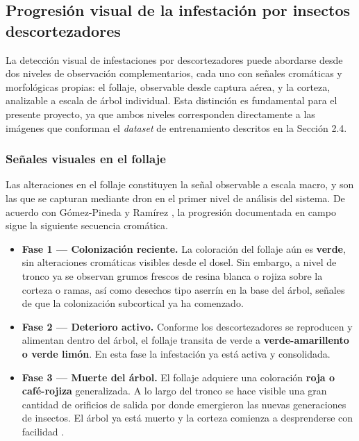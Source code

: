 \subsection{Progresión visual de la infestación por insectos descortezadores}

La detección visual de infestaciones por descortezadores puede abordarse desde dos niveles de observación complementarios, cada uno con señales cromáticas y morfológicas propias: el follaje, observable desde captura aérea, y la corteza, analizable a escala de árbol individual. Esta distinción es fundamental para el presente proyecto, ya que ambos niveles corresponden directamente a las imágenes que conforman el \textit{dataset} de entrenamiento descritos en la Sección 2.4.

\subsubsection{Señales visuales en el follaje}

Las alteraciones en el follaje constituyen la señal observable a escala macro, y son las que se capturan mediante dron en el primer nivel de análisis del sistema. De acuerdo con Gómez-Pineda y Ramírez \cite{gomez_pineda_ramirez2023descortezadores}, la progresión documentada en campo sigue la siguiente secuencia cromática. 

\begin{itemize}
    \item \textbf{Fase 1 --- Colonización reciente.} La coloración del follaje aún es \textbf{verde}, sin alteraciones cromáticas visibles desde el dosel. Sin embargo, a nivel de tronco ya se observan grumos frescos de resina blanca o rojiza sobre la corteza o ramas, así como desechos tipo aserrín en la base del árbol, señales de que la colonización subcortical ya ha comenzado.

    \item \textbf{Fase 2 --- Deterioro activo.} Conforme los descortezadores se reproducen y alimentan dentro del árbol, el follaje transita de verde a \textbf{verde-amarillento o verde limón}. En esta fase la infestación ya está activa y consolidada.

    \item \textbf{Fase 3 --- Muerte del árbol.} El follaje adquiere una coloración \textbf{roja o café-rojiza} generalizada. A lo largo del tronco se hace visible una gran cantidad de orificios de salida por donde emergieron las nuevas generaciones de insectos. El árbol ya está muerto y la corteza comienza a desprenderse con facilidad \cite{gomez_pineda_ramirez2023descortezadores}.
\end{itemize}


